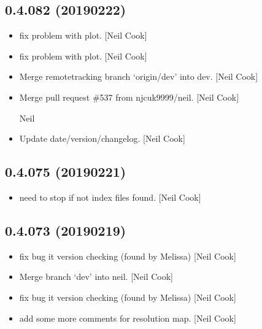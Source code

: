 \documentclass[a4paper,10pt,english]{report}
\begin{document}
\subsection{0.4.082 (2019\sphinxhyphen{}02\sphinxhyphen{}22)}
\label{\detokenize{misc/changelog:id200}}\begin{itemize}
\item {} 
 \sphinxhyphen{} fix problem with  plot. {[}Neil
Cook{]}

\item {} 
 \sphinxhyphen{} fix problem with 
plot. {[}Neil Cook{]}

\item {} 
Merge remote\sphinxhyphen{}tracking branch ‘origin/dev’ into dev. {[}Neil Cook{]}

\item {} 
Merge pull request \#537 from njcuk9999/neil. {[}Neil Cook{]}

Neil

\item {} 
Update date/version/changelog. {[}Neil Cook{]}

\end{itemize}


\subsection{0.4.075 (2019\sphinxhyphen{}02\sphinxhyphen{}21)}
\label{\detokenize{misc/changelog:id201}}\begin{itemize}
\item {} 
 \sphinxhyphen{} need to stop if not index files found. {[}Neil Cook{]}

\end{itemize}


\subsection{0.4.073 (2019\sphinxhyphen{}02\sphinxhyphen{}19)}
\label{\detokenize{misc/changelog:id202}}\begin{itemize}
\item {} 
 \sphinxhyphen{} fix bug it version checking (found by
Melissa) {[}Neil Cook{]}

\item {} 
Merge branch ‘dev’ into neil. {[}Neil Cook{]}

\item {} 
 \sphinxhyphen{} fix bug it version checking (found by
Melissa) {[}Neil Cook{]}

\item {} 
 \sphinxhyphen{} add some more comments for resolution map. {[}Neil Cook{]}

\end{itemize}
\end{document}
